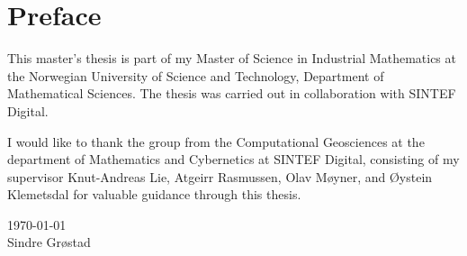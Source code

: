 {}
\chapter*{Preface}
This master's thesis is part of my Master of Science in Industrial Mathematics at the Norwegian University of Science and Technology, Department of Mathematical Sciences. The thesis was carried out in collaboration with SINTEF Digital. 

I would like to thank the group from the Computational Geosciences at the department of Mathematics and Cybernetics at SINTEF Digital, consisting of my supervisor Knut-Andreas Lie, Atgeirr Rasmussen, Olav Møyner, and Øystein Klemetsdal for valuable guidance through this thesis.

\today \\
Sindre Grøstad